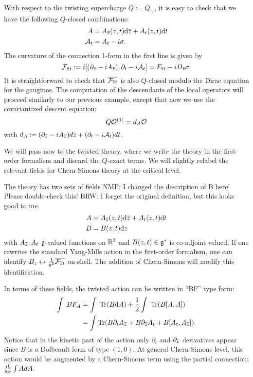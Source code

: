 \documentclass[11pt]{amsart}
\def\brian#1{{\textcolor{blue!65!red}{BRW: {#1}}}}
\def\natalie#1{{\textcolor{green!65!black}{NMP: {#1}}}}
\begin{document}
With respect to the twisting supercharge $Q:= \bar{Q}_+$, it is easy to check that we have the following $Q$-closed combinations:
\begin{align}
A & = A_{{\overline{z}}} (z,t) {\rm d} {\overline{z}} + A_{t} (z, t) {\rm d} t \\
\mathcal A_t &= A_t - i \sigma.
\end{align}
The curvature of the connection 1-form in the first line is given by
\[
\mathcal F_{{\overline{z}} t} := i  [(\partial_{{\overline{z}}} - i A_{{\overline{z}}}), \partial_t - i \mathcal A_t] = F_{{\overline{z}} t} - i D_{{\overline{z}}}\sigma.
\] It is straightforward to check that $\overline{\mathcal F_{{\overline{z}} t}}$ is also $Q$-closed modulo the Dirac equation for the gauginos. 
The computation of the descendants of the local operators will proceed similarly to our previous example, except that now we use the covariantized descent equation:
\[
Q \mathcal O^{(1)} = d_{A} \mathcal O
\] with $d_A := (\partial_{{\overline{z}}} - i A_{{\overline{z}}})d{\overline{z}} + (\partial_t - i \mathcal A_t)dt$. 

We will pass now to the twisted theory, where we write the theory in the first-order formalism and discard the $Q$-exact terms. We will slightly relabel the relevant fields for Chern-Simons theory at the critical level. 

The theory has two sets of fields \natalie{I changed the description of B here! Please double-check this!}
\brian{I forget the original definition, but this looks good to me.}
\begin{align*}
A & = A_{{\overline{z}}} (z,t) {\rm d} {\overline{z}} + A_{t} (z, t) {\rm d} t \\
B & = B (z,t) {\rm d} z 
\end{align*}
with $A_{{\overline{z}}}, A_t$ $\mathfrak g$-valued functions on $\mathbb R^3$ and $B(z,t) \in \mathfrak g^*$ is co-adjoint valued. If one rewrites the standard Yang-Mills action in the first-order formalism, one can identify $B_z \leftrightarrow {1 \over g^2} \overline{\mathcal F_{{\overline{z}} t}}$ on-shell. The addition of Chern-Simons will modify this identification. 


In terms of these fields, the twisted action can be written in ``BF'' type form:
\begin{align*}
\int \; B F_A & = \int \; \operatorname{Tr}(B {\rm d} A) +  \frac12 \int \; \operatorname{Tr}(B [A,A]) \\
& = \int \operatorname{Tr}(B \partial_t A_{{\overline{z}}} + B \partial_{{\overline{z}}} A_t + B [A_t, A_{\overline{z}}]) .
\end{align*}
Notice that in the kinetic part of the action only $\partial_t$ and $\partial_{{\overline{z}}}$ derivatives appear since $B$ is a Dolbeault form of type $(1,0)$. At general Chern-Simons level, this action would be augmented by a Chern-Simons term using the partial connection: ${i k \over 8 \pi} \int A d A$.
\end{document}
